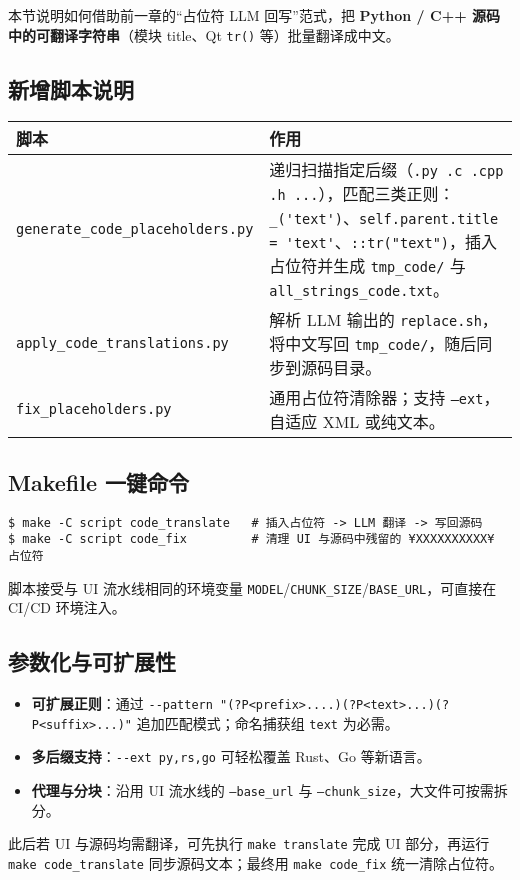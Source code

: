 \documentclass[12pt]{article}
\begin{document}
本节说明如何借助前一章的“占位符 \textrightarrow LLM \textrightarrow 回写”范式，把 \textbf{Python / C++ 源码中的可翻译字符串}（模块 title、Qt \lstinline|tr()| 等）批量翻译成中文。

\subsection{新增脚本说明}
\begin{longtable}{p{4cm} p{11cm}}
\hline
脚本 & 作用 \\
\hline
\texttt{generate\_code\_placeholders.py} & 递归扫描指定后缀（\texttt{.py .c .cpp .h ...}），匹配三类正则：\verb|_('text')|、\verb|self.parent.title = 'text'|、\verb|::tr("text")|，插入占位符并生成 \texttt{tmp\_code/} 与 \texttt{all\_strings\_code.txt}。\\
\texttt{apply\_code\_translations.py} & 解析 LLM 输出的 \texttt{replace.sh}，将中文写回 \texttt{tmp\_code/}，随后同步到源码目录。\\
\texttt{fix\_placeholders.py} & 通用占位符清除器；支持 \texttt{--ext}，自适应 XML 或纯文本。\\
\hline
\end{longtable}

\subsection{Makefile 一键命令}
\begin{lstlisting}
$ make -C script code_translate   # 插入占位符 -> LLM 翻译 -> 写回源码
$ make -C script code_fix         # 清理 UI 与源码中残留的 ¥XXXXXXXXXX¥ 占位符
\end{lstlisting}

脚本接受与 UI 流水线相同的环境变量 \texttt{MODEL}/\texttt{CHUNK\_SIZE}/\texttt{BASE\_URL}，可直接在 CI/CD 环境注入。

\subsection{参数化与可扩展性}
\begin{itemize}
  \item \textbf{可扩展正则}：通过 \lstinline|--pattern "(?P<prefix>....)(?P<text>...)(?P<suffix>...)"| 追加匹配模式；命名捕获组 \texttt{text} 为必需。
  \item \textbf{多后缀支持}：\lstinline|--ext py,rs,go| 可轻松覆盖 Rust、Go 等新语言。
  \item \textbf{代理与分块}：沿用 UI 流水线的 \texttt{--base\_url} 与 \texttt{--chunk\_size}，大文件可按需拆分。
\end{itemize}

此后若 UI 与源码均需翻译，可先执行 \lstinline|make translate| 完成 UI 部分，再运行 \lstinline|make code_translate| 同步源码文本；最终用 \lstinline|make code_fix| 统一清除占位符。
\end{document}
